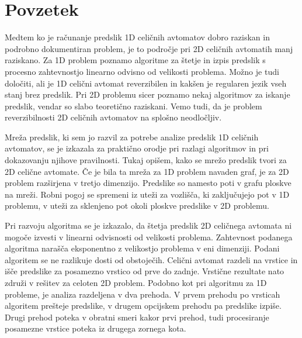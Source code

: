 \documentclass[12pt,a4paper,openany,twoside]{book}
\begin{document}

\clearpage{\pagestyle{empty}\cleardoublepage}


\setcounter{page}{1}

\chapter*{Povzetek}


Medtem ko je računanje predslik 1D celičnih avtomatov dobro raziskan in
podrobno dokumentiran problem, je to področje pri 2D celičnih avtomatih manj raziskano.
Za 1D problem poznamo algoritme za štetje in izpis predslik s
procesno zahtevnostjo linearno odvisno od velikosti problema.
Možno je tudi določiti, ali je 1D celični avtomat reverzibilen in
kakšen je regularen jezik vseh stanj brez predslik.
Pri 2D problemu sicer poznamo nekaj algoritmov za iskanje predslik,
vendar so slabo teoretično raziskani.
Vemo tudi, da je problem reverzibilnosti 2D celičnih avtomatov na splošno neodločljiv.

Mreža predslik, ki sem jo razvil za potrebe analize predslik 1D celičnih avtomatov,
se je izkazala za praktično orodje pri razlagi algoritmov in pri dokazovanju njihove pravilnosti.
Tukaj opišem, kako se mrežo predslik tvori za 2D celične avtomate.
Če je bila ta mreža za 1D problem navaden graf, je za 2D problem razširjena v tretjo dimenzijo.
Predslike so namesto poti v grafu ploskve na mreži.
Robni pogoj se spremeni iz uteži za vozlišča, ki zaključujejo pot v 1D problemu,
v uteži za sklenjeno pot okoli ploskve predslike v 2D problemu.

Pri razvoju algoritma se je izkazalo, da štetja predslik 2D celičnega avtomata
ni mogoče izvesti v linearni odvisnosti od velikosti problema.
Zahtevnost podanega algoritma narašča eksponentno z velikostjo problema v eni dimenziji.
Podani algoritem se ne razlikuje dosti od obstoječih.
Celični avtomat razdeli na vrstice in išče predslike za posamezno vrstico od prve do zadnje.
Vrstične rezultate nato združi v rešitev za celoten 2D problem.
Podobno kot pri algoritmu za 1D probleme, je analiza razdeljena v dva prehoda.
V prvem prehodu po vrsticah algoritem prešteje predslike,
v drugem opcijskem prehodu pa predslike izpiše.
Drugi prehod poteka v obratni smeri kakor prvi prehod,
tudi procesiranje posamezne vrstice poteka iz drugega zornega kota.
\end{document}
